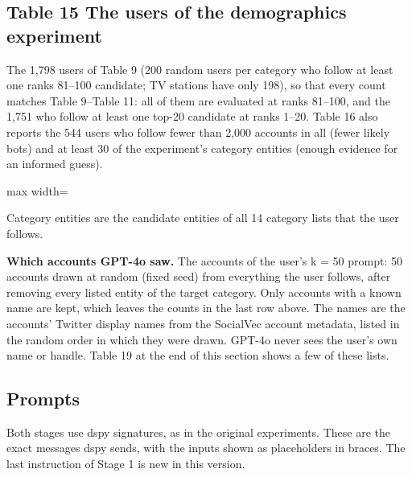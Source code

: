 \documentclass[10pt]{article}
\begin{document}
\subsection*{Table 15 \textperiodcentered{} The users of the demographics experiment}
The 1,798 users of Table 9 (200 random users per category who follow at least one ranks 81--100 candidate; TV stations have only 198), so that every count matches Table 9--Table 11: all of them are evaluated at ranks 81--100, and the 1,751 who follow at least one top-20 candidate at ranks 1--20. Table 16 also reports the 544 users who follow fewer than 2,000 accounts in all (fewer likely bots) and at least 30 of the experiment's category entities (enough evidence for an informed guess).

\begin{center}\begin{adjustbox}{max width=\linewidth}

\end{adjustbox}\end{center}

{\small Category entities are the candidate entities of all 14 category lists that the user follows.}

\textbf{Which accounts GPT-4o saw.} The accounts of the user's k = 50 prompt: 50 accounts drawn at random (fixed seed) from everything the user follows, after removing every listed entity of the target category. Only accounts with a known name are kept, which leaves the counts in the last row above. The names are the accounts' Twitter display names from the SocialVec account metadata, listed in the random order in which they were drawn. GPT-4o never sees the user's own name or handle. Table 19 at the end of this section shows a few of these lists.

\subsection*{Prompts}
Both stages use dspy signatures, as in the original experiments. These are the exact messages dspy sends, with the inputs shown as placeholders in braces. The last instruction of Stage 1 is new in this version.
\end{document}

